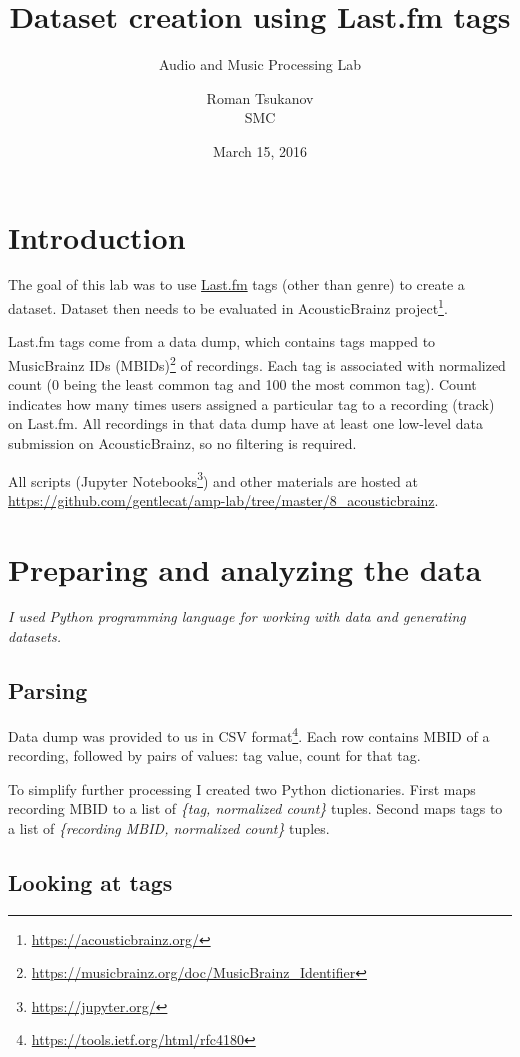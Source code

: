 \documentclass{scrartcl}
\title{Dataset creation using Last.fm tags}
\subtitle{Audio and Music Processing Lab}
\author{Roman Tsukanov \\ SMC}
\date{March 15, 2016}
\begin{document}
\maketitle


\section{Introduction}

The goal of this lab was to use \href{https://last.fm/}{Last.fm} tags (other than genre) to create a dataset. Dataset then needs to be evaluated in AcousticBrainz project\footnote{\url{https://acousticbrainz.org/}}.

Last.fm tags come from a data dump, which contains tags mapped to MusicBrainz IDs (MBIDs)\footnote{\url{https://musicbrainz.org/doc/MusicBrainz\_Identifier}} of recordings. Each tag is associated with normalized count (0 being the least common tag and 100 the most common tag). Count indicates how many times users assigned a particular tag to a recording (track) on Last.fm. All recordings in that data dump have at least one low-level data submission on AcousticBrainz, so no filtering is required.

All scripts (Jupyter Notebooks\footnote{\url{https://jupyter.org/}}) and other materials are hosted at \url{https://github.com/gentlecat/amp-lab/tree/master/8_acousticbrainz}.


\section{Preparing and analyzing the data}

\textit{I used Python programming language for working with data and generating datasets.}

\subsection{Parsing}

Data dump was provided to us in CSV format\footnote{\url{https://tools.ietf.org/html/rfc4180}}. Each row contains MBID of a recording, followed by pairs of values: tag value, count for that tag.

To simplify further processing I created two Python dictionaries. First maps recording MBID to a list of \textit{\{tag, normalized count\}} tuples. Second maps tags to a list of \textit{\{recording MBID, normalized count\}} tuples.

\subsection{Looking at tags}
\end{document}
